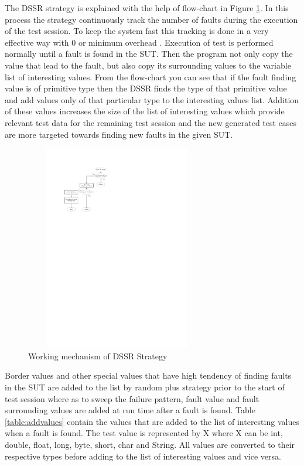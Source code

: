 \documentclass[conference]{IEEEtran}
\begin{document}
\hspace{10 mm}The DSSR strategy is explained with the help of flow-chart in Figure \ref{fig:Working_DSSS}. In this process the strategy continuously track the number of faults during the execution of the test session. To keep the system fast this tracking is done in a very effective way with 0 or minimum overhead \cite{Leitner2009}. Execution of test is performed normally until a fault is found in the SUT. Then the program not only copy the value that lead to the fault, but also copy its surrounding values to the variable list of interesting values. From the flow-chart you can see that if the fault finding value is of primitive type then the DSSR finds the type of that primitive value and add values only of that particular type to the interesting values list. Addition of these values increases the size of the list of interesting values which provide relevant test data for the remaining test session and the new generated test cases are more targeted towards finding new faults in the given SUT.\\
\begin{figure}[ht]
\centering
\includegraphics[width=8cm,height=9cm]{flowchart1.pdf}
\caption{Working mechanism of DSSR Strategy}
\label{fig:Working_DSSS}
\end{figure}

Border values and other special values that have high tendency of finding faults in the SUT are added to the list by random plus strategy prior to the start of test session where as to sweep the failure pattern, fault value and fault surrounding values are added at run time after a fault is found. Table \ref{table:addvalues} contain the values that are added to the list of interesting values when a fault is found. The test value is represented by X where X can be int, double, float, long, byte, short, char and String. All values are converted to their respective types before adding to the list of interesting values and vice versa.
\end{document}
